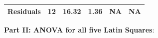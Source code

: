 \documentclass[]{article}
\begin{document}
\begin{longtable}[]{@{}cccccc@{}}
\begin{minipage}[t]{0.19\columnwidth}
\textbf{Residuals}\strut
\end{minipage} & \begin{minipage}[t]{0.06\columnwidth}\centering\strut
12\strut
\end{minipage} & \begin{minipage}[t]{0.10\columnwidth}\centering\strut
16.32\strut
\end{minipage} & \begin{minipage}[t]{0.12\columnwidth}\centering\strut
1.36\strut
\end{minipage} & \begin{minipage}[t]{0.12\columnwidth}\centering\strut
NA\strut
\end{minipage} & \begin{minipage}[t]{0.12\columnwidth}\centering\strut
NA\strut
\end{minipage}\tabularnewline
\bottomrule
\end{longtable}

\textbf{Part II: ANOVA for all five Latin Squares}:
\end{document}
